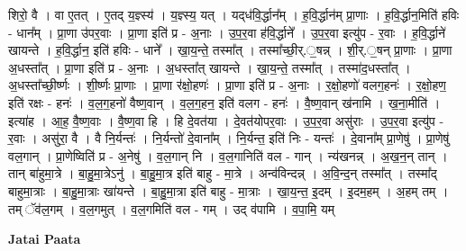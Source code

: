 \documentclass[17pt]{extarticle}
\begin{document}
शिरो॒ वै । वा ए॒तत् । ए॒तद् य॒ज्ञ्स्य॑ । य॒ज्ञ्स्य॒ यत् । यद्‍ध॑वि॒र्द्धान᳚म् । ह॒वि॒र्द्धान॑म् प्रा॒णाः । ह॒वि॒र्द्धान॒मिति॑ हविः - धान᳚म् । प्रा॒णा उ॑पर॒वाः । प्रा॒णा इति॑ प्र - अ॒नाः । उ॒प॒र॒वा ह॑वि॒र्द्धाने᳚ । उ॒प॒र॒वा इत्यु॑प - र॒वाः । ह॒वि॒र्द्धाने॑ खायन्ते । ह॒वि॒र्द्धान॒ इति॑ हविः - धाने᳚ । खा॒य॒न्ते॒ तस्मा᳚त् । तस्मा᳚च्छी॒र्.॒षन्न् । शी॒र्.॒षन् प्रा॒णाः । प्रा॒णा अ॒धस्ता᳚त् । प्रा॒णा इति॑ प्र - अ॒नाः । अ॒धस्ता᳚त् खायन्ते । खा॒य॒न्ते॒ तस्मा᳚त् । तस्मा॑द॒धस्ता᳚त् । अ॒धस्ता᳚च्छी॒र्ष्णः । शी॒र्ष्णः प्रा॒णाः । प्रा॒णा र॑क्षो॒हणः॑ । प्रा॒णा इति॑ प्र - अ॒नाः । र॒क्षो॒हणो॑ वलग॒हनः॑ । र॒क्षो॒हण॒ इति॑ रक्षः - हनः॑ । व॒ल॒ग॒हनो॑ वैष्ण॒वान् । व॒ल॒ग॒हन॒ इति॑ वलग - हनः॑ । वै॒ष्ण॒वान् ख॑नामि । ख॒ना॒मीति॑ । इत्या॑ह । आ॒ह॒ वै॒ष्ण॒वाः । वै॒ष्ण॒वा हि । हि दे॒वत॑या । दे॒वत॑योपर॒वाः । उ॒प॒र॒वा असु॑राः । उ॒प॒र॒वा इत्यु॑प - र॒वाः । असु॑रा॒ वै । वै नि॒र्यन्तः॑ । नि॒र्यन्तो॑ दे॒वाना᳚म् । नि॒र्यन्त॒ इति॑ निः - यन्तः॑ । दे॒वाना᳚म् प्रा॒णेषु॑ । प्रा॒णेषु॑ वल॒गान् । प्रा॒णेष्विति॑ प्र - अ॒नेषु॑ । व॒ल॒गान् नि । व॒ल॒गानिति॑ वल - गान् । न्य॑खनन्न् । अ॒ख॒न॒न् तान् । तान् बा॑हुमा॒त्रे । बा॒हु॒मा॒त्रेऽनु॑ । बा॒हु॒मा॒त्र इति॑ बाहु - मा॒त्रे । अन्व॑विन्दन्न् । अ॒वि॒न्द॒न् तस्मा᳚त् । तस्मा᳚द् बाहुमा॒त्राः । बा॒हु॒मा॒त्राः खा॑यन्ते । बा॒हु॒मा॒त्रा इति॑ बाहु - मा॒त्राः । खा॒य॒न्त॒ इ॒दम् । इ॒दम॒हम् । अ॒हम् तम् । तम् ॅव॑ल॒गम् । व॒ल॒गमुत् । व॒ल॒गमिति॑ वल - गम् । 
उद् व॑पामि । व॒पा॒मि॒ यम् \newline

\textbf{Jatai Paata} \newline
\end{document}
